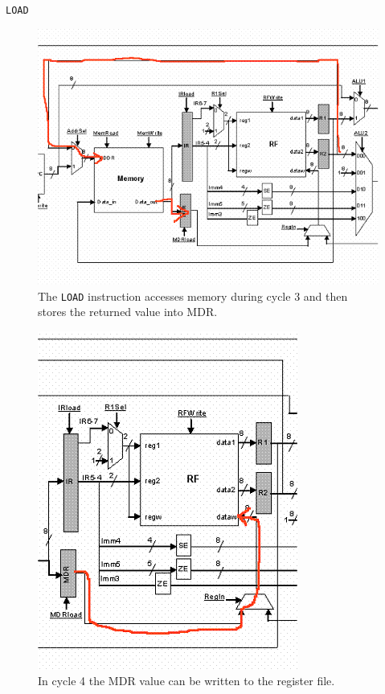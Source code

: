 \documentclass[../notes.tex]{subfiles}
\begin{document}
\texttt{LOAD}

\begin{figure}[H]
	\centering
	\includegraphics[width=0.8\linewidth]{img/image_2022-11-03-13-55-59.png}
	\caption{The \texttt{LOAD} instruction accesses memory during cycle 3 and then stores the returned value into MDR.}
\end{figure}

\begin{figure}[H]
	\centering
	\includegraphics[width=0.8\linewidth]{img/image_2022-11-03-13-56-42.png}
	\caption{In cycle 4 the MDR value can be written to the register file.}
\end{figure}
\end{document}
